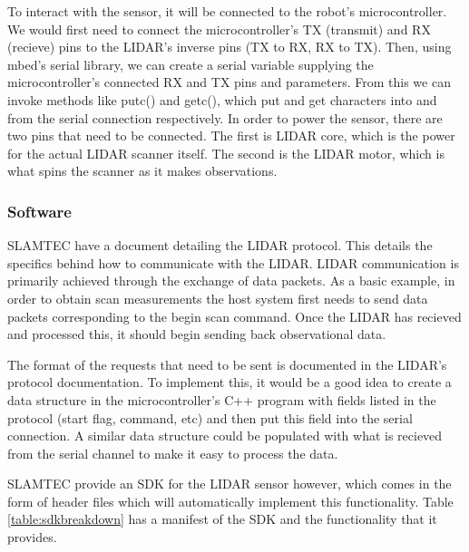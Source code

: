 				To interact with the sensor, it will be connected to the robot's microcontroller. We would first need to connect the microcontroller's TX (transmit) and RX (recieve) pins to the LIDAR's inverse pins (TX to RX, RX to TX). Then, using mbed's serial library, we can create a serial variable supplying the microcontroller's connected RX and TX pins and parameters. From this we can invoke methods like putc() and getc(), which put and get characters into and from the serial connection respectively. In order to power the sensor, there are two pins that need to be connected. The first is LIDAR core, which is the power for the actual LIDAR scanner itself. The second is the LIDAR motor, which is what spins the scanner as it makes observations. 
				
				\subsubsection{Software}
				SLAMTEC have a document detailing the LIDAR protocol. This details the specifics behind how to communicate with the LIDAR. LIDAR communication is primarily achieved through the exchange of data packets. As a basic example, in order to obtain scan measurements the host system first needs to send data packets corresponding to the begin scan command. Once the LIDAR has recieved and processed this, it should begin sending back observational data. 
				
				The format of the requests that need to be sent is documented in the LIDAR's protocol documentation\citep{rplidarprotocol}. To implement this, it would be a good idea to create a data structure in the microcontroller's C++ program with fields listed in the protocol (start flag, command, etc) and then put this field into the serial connection. A similar data structure could be populated with what is recieved from the serial channel to make it easy to process the data.
				
				SLAMTEC provide an SDK for the LIDAR sensor however, which comes in the form of header files which will automatically implement this functionality. Table \ref{table:sdkbreakdown} has a manifest of the SDK and the functionality that it provides.
				
